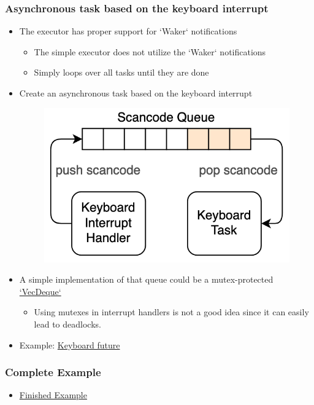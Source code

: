 \begin{frame}[fragile]
    \frametitle{Asynchronous task based on the keyboard interrupt}
% 
% 
    \begin{itemize}
        \item The executor has proper support for `Waker` notifications
    	\begin{itemize}
    	    \item The simple executor does not utilize the `Waker` notifications
    	    \item Simply loops over all tasks until they are done
    	\end{itemize} \pause

        \item Create an asynchronous task based on the keyboard interrupt
% 
    \begin{figure}
    \includegraphics[width=0.35\linewidth]{figs/scancode-queue.png}
    \end{figure} \pause

        \item A simple implementation of that queue could be a mutex-protected \href{https://doc.rust-lang.org/stable/alloc/collections/vec_deque/struct.VecDeque.html}{`VecDeque`}
    	\begin{itemize}
    	    \item Using mutexes in interrupt handlers is not a good idea since it can easily lead to deadlocks.
    	\end{itemize} \pause

        \item Example: \href{https://github.com/phil-opp/blog_os/blob/post-12/src/task/keyboard.rs}{Keyboard future}
    \end{itemize}

\end{frame}
\begin{frame}[fragile]
    \frametitle{Complete Example}
% 
% 
    \begin{itemize}
        \item \href{https://cfsamson.github.io/books-futures-explained/8_finished_example.html}{Finished Example}
    \end{itemize}
\end{frame}

